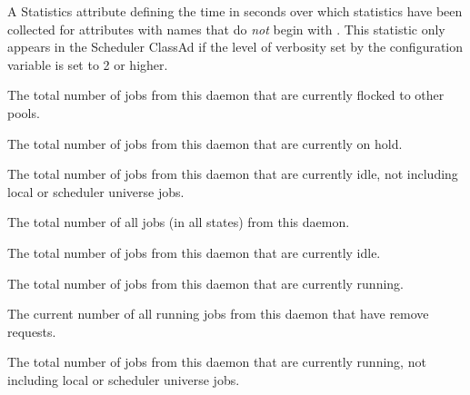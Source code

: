 \begin{description}
\item[\AdAttr{StatsLifetime}:] A Statistics attribute defining
  the time in seconds over which statistics have been collected
  for attributes with names that do \emph{not} begin with .
  This statistic only appears in the Scheduler ClassAd if the level of
  verbosity set by the configuration variable 
  is set to 2 or higher.

\item[\AdAttr{TotalFlockedJobs}:] The total number of jobs from this
   daemon that are currently flocked to other pools.

\item[\AdAttr{TotalHeldJobs}:] The total number of jobs from this
   daemon that are currently on hold.

\item[\AdAttr{TotalIdleJobs}:] The total number of jobs from this
   daemon that are currently idle, not including
  local or scheduler universe jobs.

\item[\AdAttr{TotalJobAds}:] The total number of all jobs (in all 
  states) from this  daemon.

\item[\AdAttr{TotalLocalIdleJobs}:] The total number of 
    jobs from this
   daemon that are currently idle.

\item[\AdAttr{TotalLocalRunningJobs}:] The total number of 
    jobs from this
   daemon that are currently running.

\item[\AdAttr{TotalRemovedJobs}:] The current number of all running jobs
  from this  daemon that have remove requests.

\item[\AdAttr{TotalRunningJobs}:] The total number of jobs from this
   daemon that are currently running, not including
  local or scheduler universe jobs.


\end{description}
